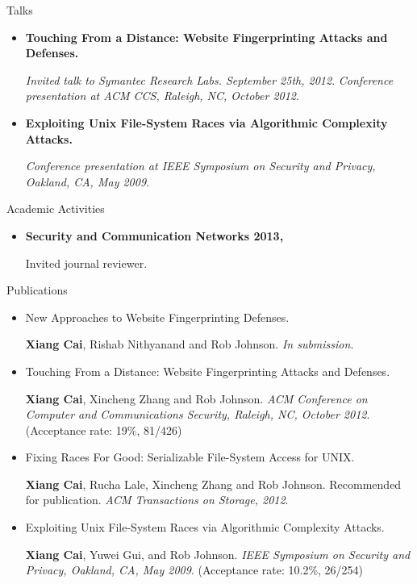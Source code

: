 \documentclass[11pt,oneside]{article}
\newenvironment{ressection}[1]{
	\vspace{4pt}
	{\fontfamily{phv}\selectfont\Large#1}
	\begin{itemize}
	\vspace{3pt}
}{
	\end{itemize}
}
\newcommand{\resitem}[1]{
	\vspace{-4pt}
	\item \begin{flushleft} #1 \end{flushleft}
}
\begin{document}
\begin{ressection}{Talks}
	\resitem{\textbf{Touching From a Distance: Website Fingerprinting
		Attacks and Defenses.} \begin{small}
		
		\textit{Invited talk to Symantec Research Labs. September 25th, 2012}. \textit{Conference presentation at ACM CCS, Raleigh, NC, October 2012}.
		\end{small}}

	\resitem{\textbf{Exploiting Unix File-System Races via Algorithmic
		Complexity Attacks.} \begin{small}
		
		\textit{Conference presentation at IEEE Symposium on Security and Privacy, Oakland, CA, May 2009}.
		\end{small}}
\end{ressection}

\begin{ressection}{Academic Activities}
	\resitem{\textbf{Security and Communication Networks 2013, } \begin{small}Invited journal reviewer.\end{small}
	}
\end{ressection}

\begin{ressection}{Publications}
	\resitem{New Approaches to Website Fingerprinting Defenses. \begin{small} \textbf{Xiang Cai}, Rishab Nithyanand
			and Rob Johnson. \textit{In submission}.
	\end{small}}

	\resitem{Touching From a Distance: Website Fingerprinting
		Attacks and Defenses. \begin{small} \textbf{Xiang Cai}, Xincheng Zhang
			and Rob Johnson. \textit{ACM Conference on Computer and Communications Security, Raleigh, NC, October 2012}. (Acceptance rate: 19\%, 81/426)\end{small}}

	\resitem{Fixing Races For Good: Serializable File-System
		Access for UNIX. \begin{small} \textbf{Xiang Cai}, Rucha Lale,
		Xincheng Zhang and Rob Johnson. Recommended for publication. \textit{ACM Transactions on Storage, 2012}.\end{small}}

	\resitem{Exploiting Unix File-System Races via Algorithmic
		Complexity Attacks. \begin{small} \textbf{Xiang Cai}, Yuwei Gui, and
			Rob Johnson. \textit{IEEE Symposium on Security and Privacy,
				Oakland, CA, May 2009}. (Acceptance rate: 10.2\%, 26/254)\end{small}}

\end{ressection}
\end{document}
